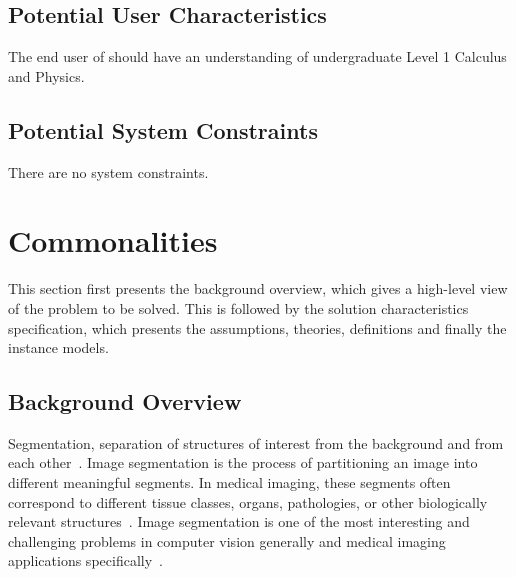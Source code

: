 \documentclass[12pt]{article}
\begin{document}
\begin{center}
\label{fg_syscontext}
\end{center}

\subsection{Potential User Characteristics} \label{sec_UserCharacteristics}

The end user of \famname{} should have an understanding of undergraduate Level
1 Calculus and Physics.

\subsection{Potential System Constraints}

There are no system constraints.

\section{Commonalities}
This section first presents the background overview, which gives a high-level view of the
problem to be solved. This is followed by the solution characteristics specification, which
presents the assumptions, theories, definitions and finally the instance models.

\subsection{Background Overview} \label{sec_Background}
Segmentation, separation of structures of interest from the background and from each other~\cite{Bankman2000}. Image segmentation is the process of partitioning an image into different meaningful segments. In medical imaging, these segments often correspond to different tissue classes, organs, pathologies, or other biologically relevant structures~\cite{Forouzanfar2010}. Image segmentation is one of the most interesting and challenging problems in computer vision generally and medical imaging applications specifically~\cite{Elnakib2011}.
\end{document}
